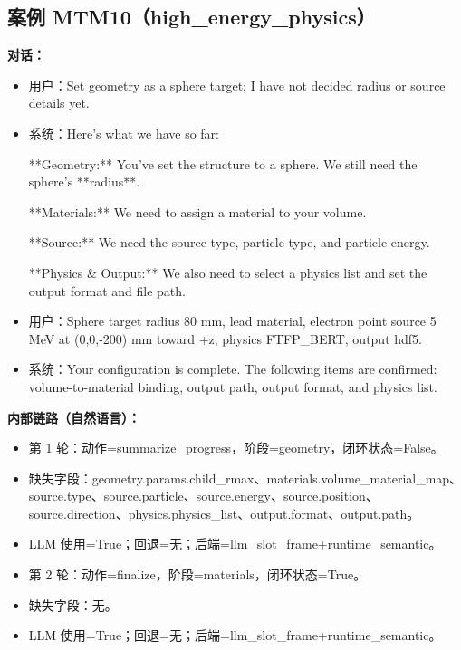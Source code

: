 \documentclass[11pt]{ctexart}
\begin{document}
\subsection{案例 MTM10（high\_energy\_physics）}
\textbf{对话：}
\begin{itemize}
\item 用户：Set geometry as a sphere target; I have not decided radius or source details yet.
\item 系统：Here's what we have so far:

**Geometry:** You've set the structure to a sphere. We still need the sphere's **radius**.

**Materials:** We need to assign a material to your volume.

**Source:** We need the source type, particle type, and particle energy.

**Physics \& Output:** We also need to select a physics list and set the output format and file path.
\item 用户：Sphere target radius 80 mm, lead material, electron point source 5 MeV at (0,0,-200) mm toward +z, physics FTFP\_BERT, output hdf5.
\item 系统：Your configuration is complete. The following items are confirmed: volume-to-material binding, output path, output format, and physics list.
\end{itemize}
\textbf{内部链路（自然语言）：}
\begin{itemize}
\item 第 1 轮：动作=summarize\_progress，阶段=geometry，闭环状态=False。
\item 缺失字段：geometry.params.child\_rmax、materials.volume\_material\_map、source.type、source.particle、source.energy、source.position、source.direction、physics.physics\_list、output.format、output.path。
\item LLM 使用=True；回退=无；后端=llm\_slot\_frame+runtime\_semantic。
\item 第 2 轮：动作=finalize，阶段=materials，闭环状态=True。
\item 缺失字段：无。
\item LLM 使用=True；回退=无；后端=llm\_slot\_frame+runtime\_semantic。
\end{itemize}
\end{document}
